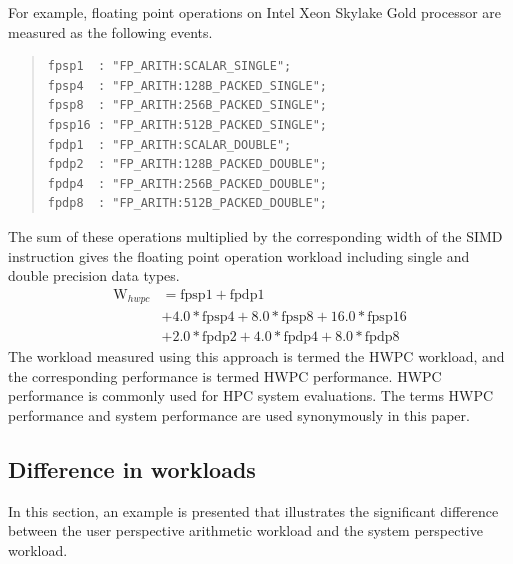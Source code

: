 \documentclass[conference]{IEEEtran}
\begin{document}
For example, floating point operations on
Intel Xeon Skylake Gold processor %
are measured as the following events.
\vspace{1mm}
\begin{quote}
\begin{small}
\begin{verbatim}
fpsp1  : "FP_ARITH:SCALAR_SINGLE";
fpsp4  : "FP_ARITH:128B_PACKED_SINGLE";
fpsp8  : "FP_ARITH:256B_PACKED_SINGLE";
fpsp16 : "FP_ARITH:512B_PACKED_SINGLE";
fpdp1  : "FP_ARITH:SCALAR_DOUBLE";
fpdp2  : "FP_ARITH:128B_PACKED_DOUBLE";
fpdp4  : "FP_ARITH:256B_PACKED_DOUBLE";
fpdp8  : "FP_ARITH:512B_PACKED_DOUBLE";
\end{verbatim}
\end{small}
\end{quote}
\vspace{1mm}
The sum of these operations multiplied by the corresponding width
of the SIMD instruction gives the floating point operation workload
including single and double precision data types.
\begin{align}
	\mathrm{W}_{hwpc} & = \mathrm{fpsp1} + \mathrm{fpdp1} \nonumber \\
			& + 4.0*\mathrm{fpsp4} + 8.0*\mathrm{fpsp8} + 16.0*\mathrm{fpsp16} \nonumber \\
			& + 2.0*\mathrm{fpdp2} + 4.0*\mathrm{fpdp4} + 8.0*\mathrm{fpdp8}
\end{align}
%
The workload measured using this approach is termed the HWPC workload,
and the corresponding performance is termed HWPC performance.
HWPC performance is commonly used for HPC system evaluations.
The terms HWPC performance and system performance are used synonymously
in this paper.

%
\subsection{Difference in workloads}
\label{subsection:difference-in-workloads}

In this section, an example is presented that illustrates the significant
difference between the user perspective arithmetic workload and
the system perspective workload.
\end{document}
